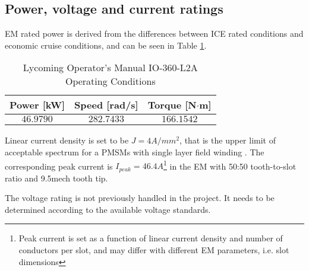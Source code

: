 \documentclass[11pt, a4paper]{article}
\begin{document}
	\subsection{Power, voltage and current ratings}
	EM rated power is derived from the differences between ICE rated conditions and economic cruise conditions, and can be seen in Table \ref{fig:EMoperations}.
	\begin{table}[h]
		\begin{center}
			\begin{tabular}{c|c|c}
				Power [kW] &  Speed [rad/s] &  Torque [N$\cdot$m]\\
				\hline
				$46.9790$ & $282.7433$ & $166.1542$
			\end{tabular}
		\end{center}
		\caption{Lycoming Operator's Manual IO-360-L2A Operating Conditions}
		\label{fig:EMoperations}
	\end{table}
	
	Linear current density is set to be $J=4A/mm^2$, that is the upper limit of acceptable spectrum for a PMSMs with single layer field winding \cite{Pyrhonen}. The corresponding peak current is $I_{peak}=46.4A$\footnote{Peak current is set as a function of linear current density and number of conductors per slot, and may differ with different EM parameters, i.e. slot dimensions} in the EM with 50:50 tooth-to-slot ratio and 9.5\textdegree mech tooth tip.
	
	The voltage rating is not previously handled in the project. It needs to be determined according to the available voltage standards.

	
\end{document}
